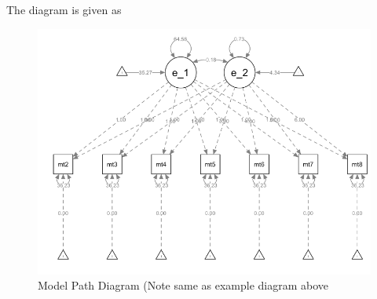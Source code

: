 The diagram is given as 
\begin{figure}[ht]
    \centering
    \includegraphics{images/006_linear_growth_model_path.png}
    \caption{Model Path Diagram (Note same as example diagram above}
    \label{fig:linear_growth_mod_path}
\end{figure}